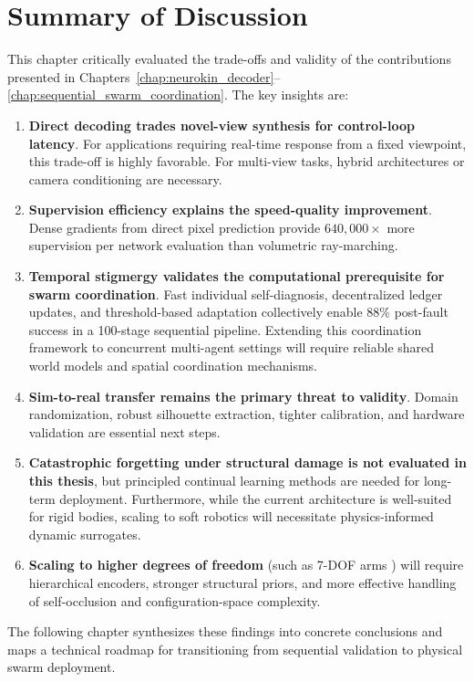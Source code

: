 \documentclass[12pt,a4paper,oneside]{report}
\begin{document}
\section{Summary of Discussion}

This chapter critically evaluated the trade-offs and validity of the contributions presented in Chapters~\ref{chap:neurokin_decoder}--\ref{chap:sequential_swarm_coordination}. The key insights are:
\begin{enumerate}
    \item \textbf{Direct decoding trades novel-view synthesis for control-loop latency}. For applications requiring real-time response from a fixed viewpoint, this trade-off is highly favorable. For multi-view tasks, hybrid architectures or camera conditioning are necessary.
    \item \textbf{Supervision efficiency explains the speed-quality improvement}. Dense gradients from direct pixel prediction provide $640,000\times$ more supervision per network evaluation than volumetric ray-marching.
    \item \textbf{Temporal stigmergy validates the computational prerequisite for swarm coordination}. Fast individual self-diagnosis, decentralized ledger updates, and threshold-based adaptation collectively enable 88\% post-fault success in a 100-stage sequential pipeline. Extending this coordination framework to concurrent multi-agent settings will require reliable shared world models and spatial coordination mechanisms.
    \item \textbf{Sim-to-real transfer remains the primary threat to validity}. Domain randomization, robust silhouette extraction, tighter calibration, and hardware validation are essential next steps.
    \item \textbf{Catastrophic forgetting under structural damage is not evaluated in this thesis}, but principled continual learning methods are needed for long-term deployment. Furthermore, while the current architecture is well-suited for rigid bodies, scaling to soft robotics will necessitate physics-informed dynamic surrogates.
    \item \textbf{Scaling to higher degrees of freedom} (such as 7-DOF arms \cite{schulze2024high}) will require hierarchical encoders, stronger structural priors, and more effective handling of self-occlusion and configuration-space complexity.
\end{enumerate}

The following chapter synthesizes these findings into concrete conclusions and maps a technical roadmap for transitioning from sequential validation to physical swarm deployment.
\end{document}
